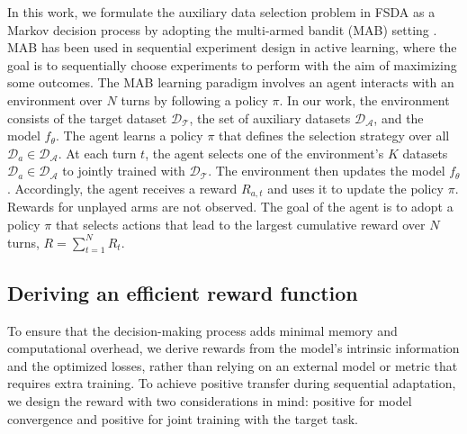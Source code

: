 In this work, we formulate the auxiliary data selection problem in FSDA as a Markov decision process by adopting the multi-armed bandit (MAB) setting \cite{macready1998bandit}.
MAB has been used in sequential experiment design in active learning,
where the goal is to sequentially choose experiments to perform with the aim of maximizing some outcomes.
The MAB learning paradigm involves 
an agent interacts with an environment over $N$ turns by following a policy $\pi$.
In our work, the environment consists of the target dataset $\mathcal{D}_\mathcal{T}$, the set of auxiliary datasets $\mathcal{D}_\mathcal{A}$, and the model $f_\theta$.
The agent learns a policy $\pi$ that defines the selection strategy over all $\mathcal{D}_a\in\mathcal{D}_\mathcal{A}$. 
At each turn $t$, the agent selects one of the environment’s $K$ datasets $\mathcal{D}_a\in\mathcal{D}_\mathcal{A}$
to jointly trained with $\mathcal{D}_\mathcal{T}$.
The environment then updates the model $f_\theta$.
Accordingly, the agent receives a reward $R_{a,t}$ and uses it to update the policy $\pi$.
Rewards for unplayed arms are not observed. 
The goal of the agent is to adopt a policy $\pi$ that selects actions that lead to the largest cumulative reward over $N$ turns, $R=\sum_{t=1}^N R_t$. 

\vspace{-0.45cm}
\subsection{Deriving an efficient reward function}
\vspace{-0.1cm}
To ensure that the decision-making process adds minimal memory and computational overhead,
we derive rewards from the model's intrinsic information and the optimized losses, rather than relying on an external model or metric that requires extra training.
To achieve positive transfer during sequential adaptation, we design the reward with two considerations in mind: positive for model convergence and positive for joint training with the target task.

